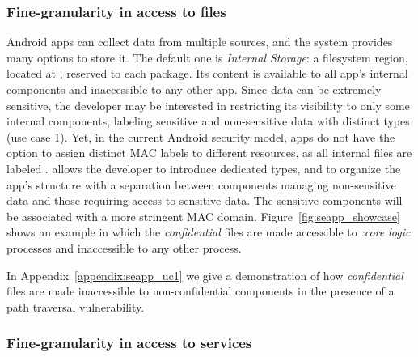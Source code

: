 \subsubsection{Fine-granularity in access to files}

Android apps can collect data from multiple sources, and the system
provides many options to store it.  The default one is {\em Internal
  Storage}: a filesystem region, located at \dataappdir, reserved to
each package.  Its content is available to all app's internal
components and inaccessible to any other app.  Since data can be
extremely sensitive, the developer may be interested in restricting
its visibility to only some internal components, labeling sensitive
and non-sensitive data with distinct \sel types (use case 1).  Yet, in
the current Android security model, apps do not have the option to
assign distinct MAC labels to different resources, as all internal
files are labeled \appdatafile.  \pap allows the developer to
introduce dedicated types, and to organize the app's structure with a
separation between components managing non-sensitive data and those
requiring access to sensitive data.  The sensitive components will be
associated with a more stringent MAC domain.
Figure~\ref{fig:seapp_showcase} shows an example in which the {\em
  confidential} files are made accessible to {\em :core\textunderscore
  logic} processes and inaccessible to any other process.

In Appendix~\ref{appendix:seapp_uc1} we give a demonstration of how {\em
  confidential} files are made inaccessible to non-confidential
components in the presence of a path traversal vulnerability.


\subsubsection{Fine-granularity in access to services}

